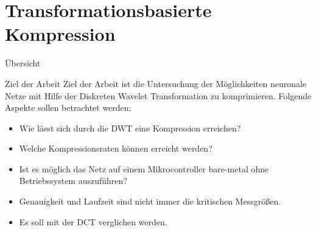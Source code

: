 \documentclass[aspectratio=169, 12pt]{beamer}
\begin{document}
\section{Transformationsbasierte Kompression}

\begin{frame}{Übersicht}
  \tableofcontents[currentsection]
\end{frame}

\begin{frame}{Ziel der Arbeit}
  Ziel der Arbeit ist die Untersuchung der Möglichkeiten neuronale Netze mit Hilfe der Diskreten Wavelet Transformation zu komprimieren.
  Folgende Aspekte sollen betrachtet werden:
  \begin{itemize}
    \item Wie lässt sich durch die DWT eine Kompression erreichen?
    \item Welche Kompressionsraten können erreicht werden?
    \item Ist es möglich das Netz auf einem Mikrocontroller bare-metal ohne Betriebssystem auszuführen?
    \item Genauigkeit und Laufzeit sind nicht immer die kritischen Messgrößen.
    \item Es soll mit der DCT verglichen werden.
  \end{itemize}
\end{frame}

\end{document}
